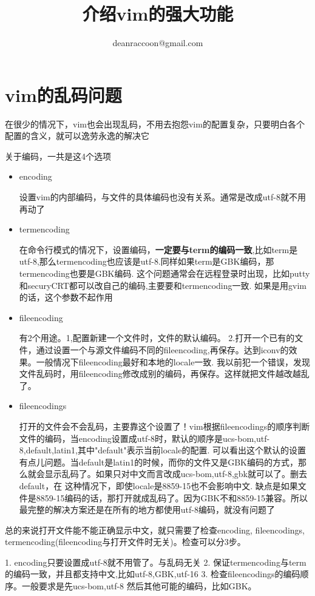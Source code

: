 \documentclass[adobefonts]{ctexart}
\title{\textbf{介绍vim的强大功能}}
\author{deanraccoon@gmail.com}
\begin{document}
\maketitle
\tableofcontents
\newpage

\section{vim的乱码问题}
在很少的情况下，vim也会出现乱码，不用去抱怨vim的配置复杂，只要明白各个配置的含义，就可以逸劳永逸的解决它

关于编码，一共是这4个选项
\begin{itemize}
\item encoding 

设置vim的内部编码，与文件的具体编码也没有关系。通常是改成utf-8就不用再动了

\item termencoding 

在命令行模式的情况下，设置编码，\textbf{一定要与term的编码一致},比如term是utf-8,那么termencoding也应该是utf-8.同样如果term是GBK编码，那termencoding也要是GBK编码. 这个问题通常会在远程登录时出现，比如putty和securyCRT都可以改自己的编码,主要要和termencoding一致. 如果是用gvim的话，这个参数不起作用

\item fileencoding  

有2个用途。1,配置新建一个文件时，文件的默认编码。 2.打开一个已有的文件，通过设置一个与源文件编码不同的fileencoding,再保存。达到iconv的效果。一般情况下fileencoding最好和本地的locale一致. 我以前犯一个错误，发现文件乱码时，用fileencoding修改成别的编码，再保存。这样就把文件越改越乱了。

\item fileencodings

打开的文件会不会乱码，主要靠这个设置了！vim根据fileencodings的顺序判断文件的编码，当encoding设置成utf-8时，默认的顺序是ucs-bom,utf-8,default,latin1,其中"default"表示当前locale的配置. 可以看出这个默认的设置有点儿问题。当default是latin1的时候，而你的文件又是GBK编码的方式，那么就会显示乱码了。如果只对中文而言改成ucs-bom,utf-8,gbk就可以了。删去default，在
这种情况下，即使locale是8859-15也不会影响中文. 缺点是如果文件是8859-15编码的话，那打开就成乱码了。因为GBK不和8859-15兼容。所以最完整的解决方案还是在所有的地方都使用utf-8编码，就没有问题了
\end{itemize}
总的来说打开文件能不能正确显示中文，就只需要了检查encoding, fileencodings, termencoding(fileencoding与打开文件时无关)。检查可以分3步。

1. encoding只要设置成utf-8就不用管了。与乱码无关
2. 保证termencoding与term的编码一致，并且都支持中文,比如utf-8,GBK,utf-16
3. 检查fileencodings的编码顺序。一般要求是先ucs-bom,utf-8 然后其他可能的编码，比如GBK。
\end{document}
